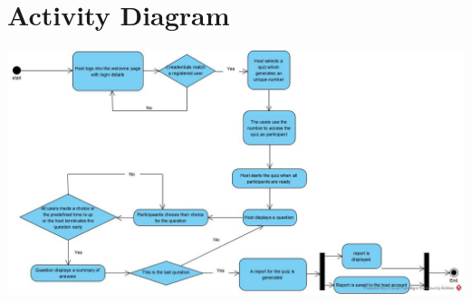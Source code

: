 \documentclass[a4paper]{article}
\begin{document}
	\newpage
	\section{Activity Diagram}
	\includegraphics[scale=0.6]{Activity_Diagram1}
\end{document}
